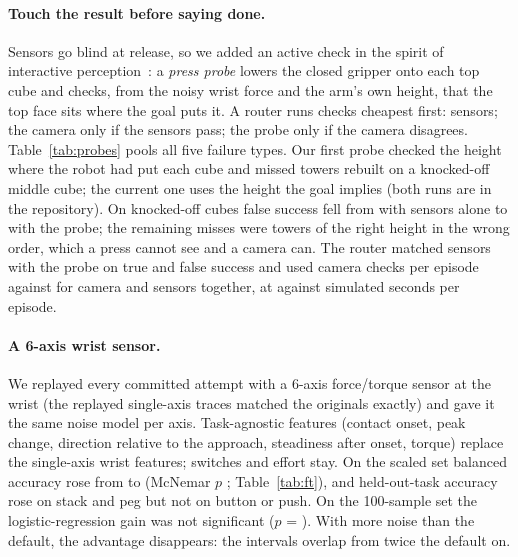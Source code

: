 \documentclass[10pt,twocolumn]{article}
\begin{document}
\paragraph{Touch the result before saying done.} Sensors go blind at release, so we added an active check in the
spirit of interactive perception~\cite{interactive}: a \emph{press probe} lowers the closed gripper onto each top
cube and checks, from the noisy wrist force and the arm's own height, that the top face sits where the goal puts
it. A router runs checks cheapest first: sensors; the camera only if the sensors pass; the probe only if the camera
disagrees. Table~\ref{tab:probes} pools all five failure types. Our first probe checked the height where the robot
had put each cube and missed towers rebuilt on a knocked-off middle cube; the current one uses the height the goal
implies (both runs are in the repository). On knocked-off cubes false success fell from \KnockSensorsFalse{} with
sensors alone to \KnockProbeFalse{} with the probe; the remaining misses were towers of the right height in the wrong order, which a press cannot
see and a camera can. The router matched sensors with the probe on true and false success and used \RouterCamera{} camera checks per episode
against \CombinedCamera{} for camera and sensors together, at \RouterSimS{} against \CombinedSimS{} simulated
seconds per episode.
\begin{table}[t]\centering\small\caption{Checking strategies over all five failure types (360 episodes each): true and false success (\%, Wilson interval), false success when the cube was knocked off after release, simulated seconds, camera checks and probes per episode.}\label{tab:probes}\end{table}

\paragraph{A 6-axis wrist sensor.} We replayed every committed attempt with a 6-axis force/torque sensor at the
wrist (the replayed single-axis traces matched the originals exactly) and gave it the same noise model per axis.
Task-agnostic features (contact onset, peak change, direction relative to the approach, steadiness after onset,
torque) replace the single-axis wrist features; switches and effort stay. On the scaled set balanced accuracy rose
from \FtSingle{} to \FtSix{} (McNemar $p$ \FtP; Table~\ref{tab:ft}), and held-out-task accuracy rose on stack and peg
but not on button or push. On the 100-sample set the logistic-regression gain was not significant ($p$ = \FtSmallP).
With more noise than the default, the advantage disappears: the intervals overlap from twice the default on.
\begin{table}[!htb]\centering\small\resizebox{\columnwidth}{!}{}\caption{Single-axis vs.\ 6-axis wrist sensing, scaled set. McNemar: samples only 6-axis / only single-axis got right.}\label{tab:ft}\end{table}
\end{document}
